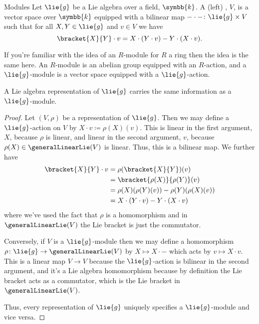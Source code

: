 \documentclass[fleqn]{NotesClass}
\renewcommand{\field}{\symbb{k}}
\begin{document}
    \begin{dfn}{Modules}{}
        Let \(\lie{g}\) be a Lie algebra over a field, \(\field\).
        A (left) , \(V\), is a vector space over \(\field\) equipped with a bilinear map \({-} \cdot {-} \colon \lie{g} \times V\) such that for all \(X, Y \in \lie{g}\) and \(v \in V\) we have
        \begin{equation}
            \bracket{X}{Y} \cdot v = X \cdot (Y \cdot v) - Y \cdot (X \cdot v).
        \end{equation}
    \end{dfn}
    
    If you're familiar with the idea of an \(R\)-module for \(R\) a ring then the idea is the same here.
    An \(R\)-module is an abelian group equipped with an \(R\)-action, and a \(\lie{g}\)-module is a vector space equipped with a \(\lie{g}\)-action.
    
    \begin{prp}{}{}
        A Lie algebra representation of \(\lie{g}\) carries the same information as a \(\lie{g}\)-module.
        \begin{proof}
            Let \((V, \rho)\) be a representation of \(\lie{g}\).
            Then we may define a \(\lie{g}\)-action on \(V\) by \(X \cdot v \coloneqq \rho(X)(v)\).
            This is linear in the first argument, \(X\), because \(\rho\) is linear, and linear in the second argument, \(v\), because \(\rho(X) \in \generalLinearLie(V)\) is linear.
            Thus, this is a bilinear map.
            We further have
            \begin{align}
                \bracket{X}{Y} \cdot v &= \rho(\bracket{X}{Y})(v)\\
                &= \bracket{\rho(X)}{\rho(Y)}(v)\\
                &= \rho(X)(\rho(Y)(v)) - \rho(Y)(\rho(X)(v))\\
                &= X \cdot (Y \cdot v) - Y \cdot (X \cdot v)
            \end{align}
            where we've used the fact that \(\rho\) is a homomorphism and in \(\generalLinearLie(V)\) the Lie bracket is just the commutator.
            
            Conversely, if \(V\) is a \(\lie{g}\)-module then we may define a homomorphism \(\rho \colon \lie{g} \to \generalLinearLie(V)\) by \(X \mapsto X \cdot {-}\) which acts by \(v \mapsto X \cdot v\).
            This is a linear map \(V \to V\) because the \(\lie{g}\)-action is bilinear in the second argument, and it's a Lie algebra homomorphism because by definition the Lie bracket acts as a commutator, which is the Lie bracket in \(\generalLinearLie(V)\).
            
            Thus, every representation of \(\lie{g}\) uniquely specifies a \(\lie{g}\)-module and vice versa.
        \end{proof} 
    \end{prp}
    
\end{document}
